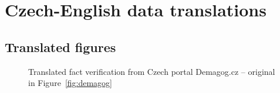 \chapter{Czech-English data translations}
\section{Translated figures}

\begin{figure}[H]
\centering
\caption[English Translation of Figure~\ref{fig:demagog}]{Translated fact verification from Czech portal \textsf{Demagog.cz} -- original in Figure~\ref{fig:demagog}}
\label{trans:demagog}
\end{figure}


